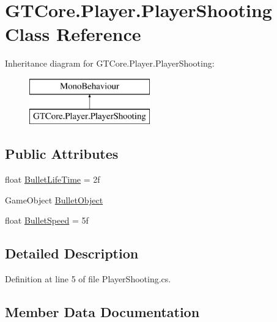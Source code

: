 \hypertarget{class_g_t_core_1_1_player_1_1_player_shooting}{}\section{G\+T\+Core.\+Player.\+Player\+Shooting Class Reference}
\label{class_g_t_core_1_1_player_1_1_player_shooting}
Inheritance diagram for G\+T\+Core.\+Player.\+Player\+Shooting\+:\begin{figure}[H]
\begin{center}
\leavevmode
\includegraphics[height=2.000000cm]{class_g_t_core_1_1_player_1_1_player_shooting}
\end{center}
\end{figure}
\subsection*{Public Attributes}
\begin{DoxyCompactItemize}
\item 
float \hyperlink{class_g_t_core_1_1_player_1_1_player_shooting_a155b801d0290db5d7f22570912a391ba}{Bullet\+Life\+Time} = 2f
\item 
Game\+Object \hyperlink{class_g_t_core_1_1_player_1_1_player_shooting_a51b4f43ad1484327b923fd5ee6aa3e88}{Bullet\+Object}
\item 
float \hyperlink{class_g_t_core_1_1_player_1_1_player_shooting_a4666947a39a68d315e612c4b8fd27804}{Bullet\+Speed} = 5f
\end{DoxyCompactItemize}


\subsection{Detailed Description}


Definition at line 5 of file Player\+Shooting.\+cs.



\subsection{Member Data Documentation}
\hypertarget{class_g_t_core_1_1_player_1_1_player_shooting_a155b801d0290db5d7f22570912a391ba}{}
